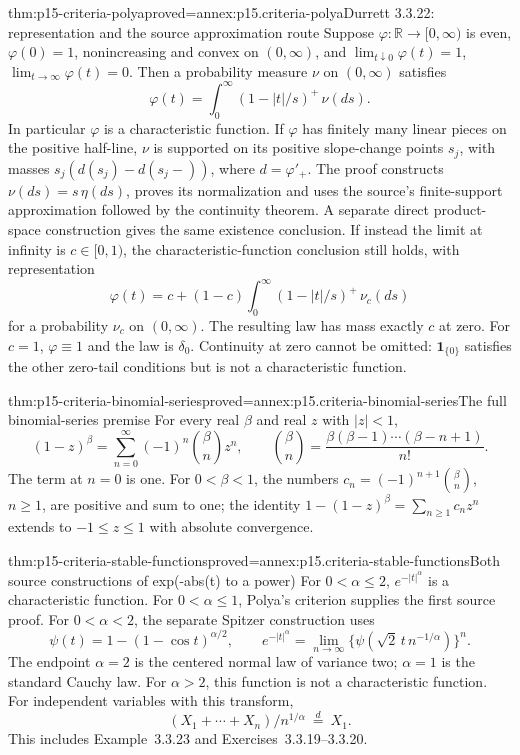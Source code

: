 \begin{hbtheorem}{thm:p15-criteria-polya}{proved=annex:p15.criteria-polya}{Durrett 3.3.22: representation and the source approximation route}
Suppose \(\varphi:\mathbb R\to[0,\infty)\) is even,
\(\varphi(0)=1\), nonincreasing and convex on \((0,\infty)\),
and
\(\lim_{t\downarrow0}\varphi(t)=1\),
\(\lim_{t\to\infty}\varphi(t)=0\).
Then a probability measure \(\nu\) on \((0,\infty)\) satisfies
\[
 \varphi(t)=\int_0^\infty(1-|t|/s)^+\,\nu(ds).
\]
In particular \(\varphi\) is a characteristic function.
If \(\varphi\) has finitely many linear pieces on the positive
half-line, \(\nu\) is supported on its positive slope-change
points \(s_j\), with masses \(s_j(d(s_j)-d(s_j-))\),
where \(d=\varphi'_+\).
The proof constructs \(\nu(ds)=s\,\eta(ds)\), proves its
normalization and uses the source's finite-support
approximation followed by the continuity theorem.
A separate direct product-space construction gives the same
existence conclusion.
If instead the limit at infinity is \(c\in[0,1)\), the
characteristic-function conclusion still holds, with representation
\[
 \varphi(t)=c+(1-c)\int_0^\infty(1-|t|/s)^+\,\nu_c(ds)
\]
for a probability \(\nu_c\) on \((0,\infty)\).
The resulting law has mass exactly \(c\) at zero.
For \(c=1\), \(\varphi\equiv1\) and the law is \(\delta_0\).
Continuity at zero cannot be omitted: \(\mathbf1_{\{0\}}\)
satisfies the other zero-tail conditions but is not a
characteristic function.
\end{hbtheorem}

\begin{hblemma}{thm:p15-criteria-binomial-series}{proved=annex:p15.criteria-binomial-series}{The full binomial-series premise}
For every real \(\beta\) and real \(z\) with \(|z|<1\),
\[
 (1-z)^\beta=\sum_{n=0}^\infty(-1)^n\binom\beta n z^n,
 \qquad
 \binom\beta n=\frac{\beta(\beta-1)\cdots(\beta-n+1)}{n!}.
\]
The term at \(n=0\) is one.
For \(0<\beta<1\), the numbers
\(c_n=(-1)^{n+1}\binom\beta n\), \(n\geq1\),
are positive and sum to one; the identity
\(1-(1-z)^\beta=\sum_{n\geq1}c_nz^n\) extends to
\(-1\leq z\leq1\) with absolute convergence.
\end{hblemma}

\begin{hbtheorem}{thm:p15-criteria-stable-functions}{proved=annex:p15.criteria-stable-functions}{Both source constructions of exp(-abs(t) to a power)}
For \(0<\alpha\leq2\), \(e^{-|t|^\alpha}\) is a characteristic
function. For \(0<\alpha\leq1\), Polya's criterion supplies
the first source proof. For \(0<\alpha<2\), the separate
Spitzer construction uses
\[
 \psi(t)=1-(1-\cos t)^{\alpha/2},\qquad
 e^{-|t|^\alpha}
 =\lim_{n\to\infty}
       \{\psi(\sqrt2\,t\,n^{-1/\alpha})\}^n.
\]
The endpoint \(\alpha=2\) is the centered normal law of variance
two; \(\alpha=1\) is the standard Cauchy law.
For \(\alpha>2\), this function is not a characteristic function.
For independent variables with this transform,
\[
 (X_1+\cdots+X_n)/n^{1/\alpha}\ \stackrel d=\ X_1.
\]
This includes Example~3.3.23 and Exercises~3.3.19--3.3.20.
\end{hbtheorem}

